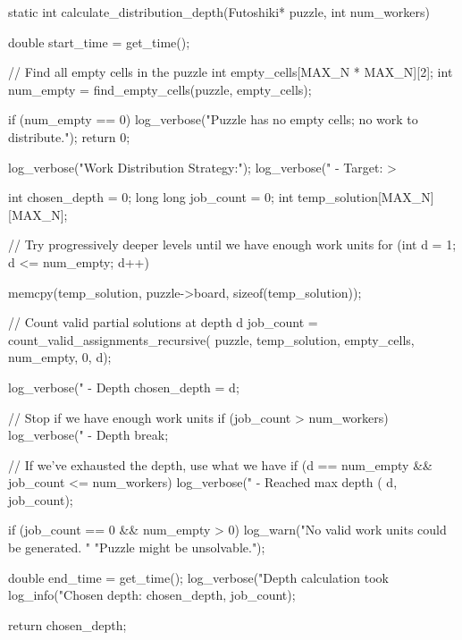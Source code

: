 static int calculate_distribution_depth(Futoshiki* puzzle, int num_workers) {
    double start_time = get_time();
    
    // Find all empty cells in the puzzle
    int empty_cells[MAX_N * MAX_N][2];
    int num_empty = find_empty_cells(puzzle, empty_cells);
    
    if (num_empty == 0) {
        log_verbose("Puzzle has no empty cells; no work to distribute.");
        return 0;
    }
    
    log_verbose("Work Distribution Strategy:");
    log_verbose("  - Target: >%
    
    int chosen_depth = 0;
    long long job_count = 0;
    int temp_solution[MAX_N][MAX_N];
    
    // Try progressively deeper levels until we have enough work units
    for (int d = 1; d <= num_empty; d++) {
        memcpy(temp_solution, puzzle->board, sizeof(temp_solution));
        
        // Count valid partial solutions at depth d
        job_count = count_valid_assignments_recursive(
            puzzle, temp_solution, empty_cells, num_empty, 0, d);
        
        log_verbose("  - Depth %
        chosen_depth = d;
        
        // Stop if we have enough work units
        if (job_count > num_workers) {
            log_verbose("  - Depth %
            break;
        }
        
        // If we've exhausted the depth, use what we have
        if (d == num_empty && job_count <= num_workers) {
            log_verbose("  - Reached max depth (%
                       d, job_count);
        }
    }
    
    if (job_count == 0 && num_empty > 0) {
        log_warn("No valid work units could be generated. "
                 "Puzzle might be unsolvable.");
    }
    
    double end_time = get_time();
    log_verbose("Depth calculation took %
    log_info("Chosen depth: %
             chosen_depth, job_count);
    
    return chosen_depth;
}

